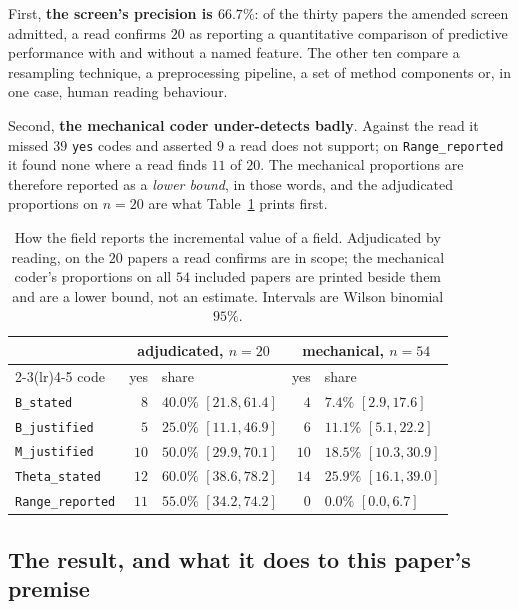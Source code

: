 \documentclass[preprint,12pt]{elsarticle}
\begin{document}
First, \textbf{the screen's precision is $66.7\%$}: of the thirty papers the
amended screen admitted, a read confirms $20$ as reporting a quantitative
comparison of predictive performance with and without a named feature. The
other ten compare a resampling technique, a preprocessing pipeline, a set of
method components or, in one case, human reading behaviour.

Second, \textbf{the mechanical coder under-detects badly}. Against the read it
missed $39$ \texttt{yes} codes and asserted $9$ a read does not support; on
\texttt{Range\_reported} it found none where a read finds $11$ of $20$. The
mechanical proportions are therefore reported as a \emph{lower bound}, in
those words, and the adjudicated proportions on $n=20$ are what
Table~\ref{tab:audit} prints first.

\begin{table}[htbp]
\centering
\caption{How the field reports the incremental value of a field. Adjudicated
by reading, on the $20$ papers a read confirms are in scope; the mechanical
coder's proportions on all $54$ included papers are printed beside them and
are a lower bound, not an estimate. Intervals are Wilson binomial $95\%$.}
\label{tab:audit}
\begin{tabular}{lrlrl}
\toprule
& \multicolumn{2}{c}{adjudicated, $n=20$} & \multicolumn{2}{c}{mechanical, $n=54$} \\
\cmidrule(lr){2-3}\cmidrule(lr){4-5}
code & yes & share & yes & share \\
\midrule
\texttt{B\_stated}       & $8$  & $40.0\%$ $[21.8,61.4]$ & $4$  & $7.4\%$ $[2.9,17.6]$ \\
\texttt{B\_justified}    & $5$  & $25.0\%$ $[11.1,46.9]$ & $6$  & $11.1\%$ $[5.1,22.2]$ \\
\texttt{M\_justified}    & $10$ & $50.0\%$ $[29.9,70.1]$ & $10$ & $18.5\%$ $[10.3,30.9]$ \\
\texttt{Theta\_stated}   & $12$ & $60.0\%$ $[38.6,78.2]$ & $14$ & $25.9\%$ $[16.1,39.0]$ \\
\texttt{Range\_reported} & $11$ & $55.0\%$ $[34.2,74.2]$ & $0$  & $0.0\%$ $[0.0,6.7]$ \\
\bottomrule
\end{tabular}
\end{table}

\subsection{The result, and what it does to this paper's premise}
\label{sec:audit:verdict}
\end{document}
